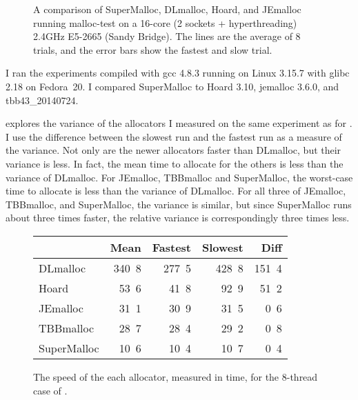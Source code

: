 \documentclass[natbib,sort&compress,10pt]{sigplanconf}
\newcommand{\ns}[1]{\unit{#1}\nano\second{}}
\begin{document}
\begin{figure}

\caption{A comparison of SuperMalloc, DLmalloc, Hoard, and JEmalloc
  running malloc-test on a 16-core (2 sockets + hyperthreading) 2.4GHz
  E5-2665 (Sandy Bridge).  The lines are the average of 8 trials, and
  the error bars show the fastest and slow trial.}
\label{fig:datalock}
\vspace*{-3ex}
\end{figure}

I ran the experiments compiled with gcc 4.8.3 running on Linux 3.15.7
with glibc 2.18 on Fedora~20.  I compared SuperMalloc to Hoard 3.10,
jemalloc 3.6.0, and tbb43\_20140724.

 explores the variance of the allocators I measured
on the same experiment as for .  I use the difference
between the slowest run and the fastest run as a measure of the
variance.  Not only are the newer allocators faster than DLmalloc, but
their variance is less.  In fact, the mean time to allocate for the
others is less than the variance of DLmalloc. For JEmalloc, TBBmalloc
and SuperMalloc, the worst-case time to allocate is less than the
variance of DLmalloc.  For all three of JEmalloc, TBBmalloc, and
SuperMalloc, the variance is similar, but since SuperMalloc runs about
three times faster, the relative variance is correspondingly three
times less.

\begin{figure}
\begin{center}
\begin{tabular}{l@{}rrrr}
            & Mean       & Fastest    & Slowest     & Diff       \\ \hline
DLmalloc    & \ns{340.8} & \ns{277.5} & \ns{428.8}  & \ns{151.4} \\
Hoard       & \ns{ 53.6} & \ns{ 41.8} & \ns{ 92.9}  & \ns{ 51.2} \\
JEmalloc    & \ns{ 31.1} & \ns{ 30.9} & \ns{ 31.5}  & \ns{  0.6} \\
TBBmalloc   & \ns{ 28.7} & \ns{ 28.4} & \ns{ 29.2}  & \ns{  0.8} \\
SuperMalloc & \ns{ 10.6} & \ns{ 10.4} & \ns{ 10.7}  & \ns{  0.4} \\
\end{tabular}
\end{center}
\caption{The speed of the each allocator, measured in time, for the
  8-thread case of .  }
\label{fig:variance}
\end{figure}
\end{document}
